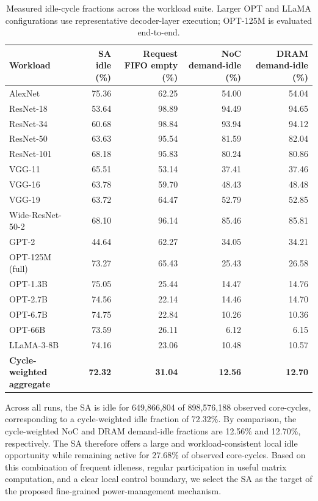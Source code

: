 \begin{table}[t]
  \centering
  \caption{Measured idle-cycle fractions across the workload suite. Larger
  OPT and LLaMA configurations use representative decoder-layer execution;
  OPT-125M is evaluated end-to-end.}
  \label{tab:component-characterization}
  \begin{tabular}{lrrrr}
    \toprule
    Workload & SA idle (\%) & Request FIFO empty (\%) &
    NoC demand-idle (\%) & DRAM demand-idle (\%) \\
    \midrule
    AlexNet            & 75.36 & 62.25 & 54.00 & 54.04 \\
    ResNet-18          & 53.64 & 98.89 & 94.49 & 94.65 \\
    ResNet-34          & 60.68 & 98.84 & 93.94 & 94.12 \\
    ResNet-50          & 63.63 & 95.54 & 81.59 & 82.04 \\
    ResNet-101         & 68.18 & 95.83 & 80.24 & 80.86 \\
    VGG-11             & 65.51 & 53.14 & 37.41 & 37.46 \\
    VGG-16             & 63.78 & 59.70 & 48.43 & 48.48 \\
    VGG-19             & 63.72 & 64.47 & 52.79 & 52.85 \\
    Wide-ResNet-50-2   & 68.10 & 96.14 & 85.46 & 85.81 \\
    GPT-2              & 44.64 & 62.27 & 34.05 & 34.21 \\
    OPT-125M (full)    & 73.27 & 65.43 & 25.43 & 26.58 \\
    OPT-1.3B           & 75.05 & 25.44 & 14.47 & 14.76 \\
    OPT-2.7B           & 74.56 & 22.14 & 14.46 & 14.70 \\
    OPT-6.7B           & 74.75 & 22.84 & 10.26 & 10.36 \\
    OPT-66B            & 73.59 & 26.11 &  6.12 &  6.15 \\
    LLaMA-3-8B         & 74.16 & 23.06 & 10.48 & 10.57 \\
    \midrule
    \textbf{Cycle-weighted aggregate}
                       & \textbf{72.32} & \textbf{31.04} &
                         \textbf{12.56} & \textbf{12.70} \\
    \bottomrule
  \end{tabular}
\end{table}

Across all runs, the SA is idle for 649,866,804 of 898,576,188 observed
core-cycles, corresponding to a cycle-weighted idle fraction of 72.32\%.
By comparison, the cycle-weighted NoC and DRAM demand-idle fractions are
12.56\% and 12.70\%, respectively. The SA therefore offers a large and
workload-consistent local idle opportunity while remaining active for
27.68\% of observed core-cycles. Based on this combination of frequent
idleness, regular participation in useful matrix computation, and a clear
local control boundary, we select the SA as the target of the proposed
fine-grained power-management mechanism.
